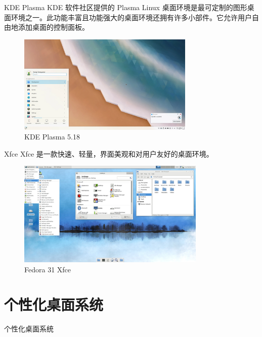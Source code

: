 \documentclass[UTF8]{ctexbeamer}
\begin{document}
\begin{frame}{KDE Plasma}
    KDE 软件社区提供的 Plasma Linux 桌面环境是最可定制的图形桌面环境之一。此功能丰富且功能强大的桌面环境还拥有许多小部件。它允许用户自由地添加桌面的控制面板。
    
    \begin{figure}
        \centering
        \includegraphics[width=0.75\textwidth]{plasma-5.18.png}
        \caption{KDE Plasma 5.18}
        \label{fig:plasma}
    \end{figure}
\end{frame}

\begin{frame}{Xfce}
    Xfce 是一款快速、轻量，界面美观和对用户友好的桌面环境。
    
    \begin{figure}
        \centering
        \includegraphics[width=0.8\textwidth]{xfce.png}
        \caption{Fedora 31 Xfce}
        \label{fig:xfce}
    \end{figure}
\end{frame}

\section{个性化桌面系统}

\begin{frame}{个性化桌面系统}
    
\end{frame}
\end{document}

